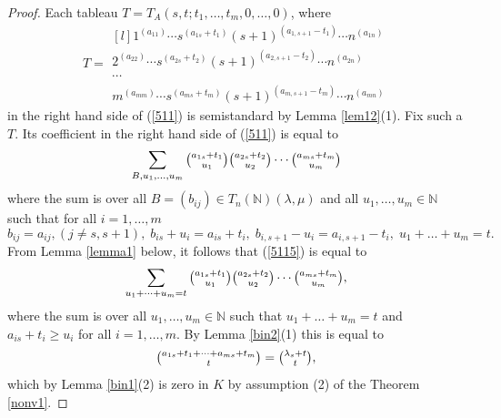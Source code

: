 \documentclass[ALCO,Unicode]{cedram}
\newcommand{\la}{\lambda}
\numberwithin{equation}{section}
\begin{document}
\begin{proof}
Each tableau $T=T_A(s,t;t_1,\dots,t_{m},0,\dots,0)$, where
\begin{equation}\label{514}T=\begin{matrix*}[l]
		1^{(a_{11})} \cdots s^{(a_{1s}+t_1)}(s+1)^{(a_{1,s+1}-t_1)} \cdots n^{(a_{1n})} \\
		2^{(a_{22})} \cdots s^{(a_{2s}+t_2)}(s+1)^{(a_{2,s+1}-t_2)} \cdots n^{(a_{2n})} \\
		\cdots \\ 
		m^{(a_{mm})}\cdots s^{(a_{ms}+t_m)}(s+1)^{(a_{m,s+1}-t_m)} \cdots n^{(a_{mn})}   \end{matrix*}\end{equation}
in the right hand side of (\ref{511}) is semistandard by Lemma \ref{lem12}(1). Fix such a $T$. Its coefficient in the right hand side of (\ref{511}) is equal to   \begin{equation}\label{5115}\sum_{B, u_1,\dots,u_{m}}\tbinom{a_{1s}+t_1}{u_1}\tbinom{a_{2s}+t_2}{u_2} \cdots \tbinom{a_{ms}+t_m}{u_m}
	\end{equation} where the sum is over all $B=(b_{ij}) \in T_{n}(\mathbb{N})(\la, \mu)$ and all  $u_1,\dots,u_m \in \mathbb{N}$ such that for all $i=1,\dots,m$ 
	\begin{equation}
		\label{5116}b_{ij}=a_{ij}, (j\neq s, s+1), \; b_{is}+u_i=a_{is}+t_i, \; b_{i,s+1}-u_i=a_{i,s+1}-t_i, \; u_1+ \dots +u_m=t.
	\end{equation}
From Lemma \ref{lemma1} below, it follows that (\ref{5115}) is equal to \[\sum_{ u_1+\dots+u_{m}=t}\tbinom{a_{1s}+t_1}{u_1}\tbinom{a_{2s}+t_2}{u_2} \cdots \tbinom{a_{ms}+t_m}{u_m},\] where the sum is over all  $u_1,\dots,u_m \in \mathbb{N}$ such that $u_1+\dots+u_m=t$ and $a_{is}+t_i \ge u_i$ for all $i=1,\dots,m$. By Lemma \ref{bin2}(1) this is equal to \[\tbinom{a_{1s}+t_1 + \dots +a_{ms}+t_m}{t} = \tbinom{\la_s+t}{t},\] which by Lemma \ref{bin1}(2) is zero in $K$ by assumption (2) of the Theorem \ref{nonv1}.


\end{proof}
\end{document}
